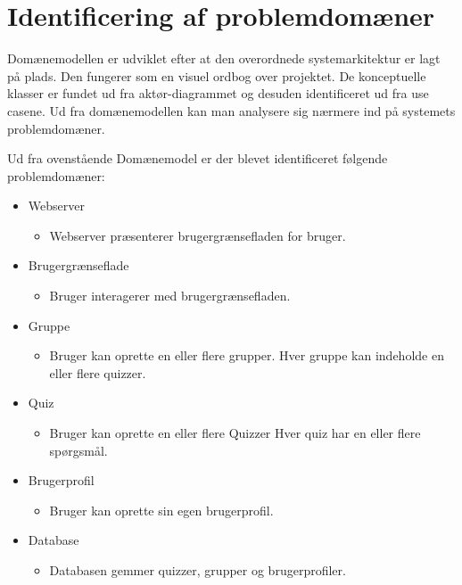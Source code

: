 \chapter{Identificering af problemdomæner}

Domænemodellen er udviklet efter at den overordnede systemarkitektur er lagt på plads. Den fungerer som en visuel ordbog over projektet. De konceptuelle klasser er fundet ud fra aktør-diagrammet og desuden identificeret ud fra use casene. Ud fra domænemodellen kan man analysere sig nærmere ind på systemets problemdomæner.


Ud fra ovenstående Domænemodel er der blevet identificeret følgende problemdomæner:

\begin{itemize}
	\item Webserver
	\begin{itemize}
		\item Webserver præsenterer brugergrænsefladen for bruger.
	\end{itemize}
	\item Brugergrænseflade
	\begin{itemize}
		\item Bruger interagerer med brugergrænsefladen.
	\end{itemize}
		\item Gruppe
	\begin{itemize}
		\item Bruger kan oprette en eller flere grupper. Hver gruppe kan indeholde en eller flere quizzer.
	\end{itemize}
		\item Quiz
	\begin{itemize}
		\item Bruger kan oprette en eller flere Quizzer Hver quiz har en eller flere spørgsmål.
	\end{itemize}
		\item Brugerprofil
	\begin{itemize}
		\item Bruger kan oprette sin egen brugerprofil.
	\end{itemize}
	\item Database
	\begin{itemize}
		\item Databasen gemmer quizzer, grupper og brugerprofiler.
	\end{itemize}
\end{itemize}